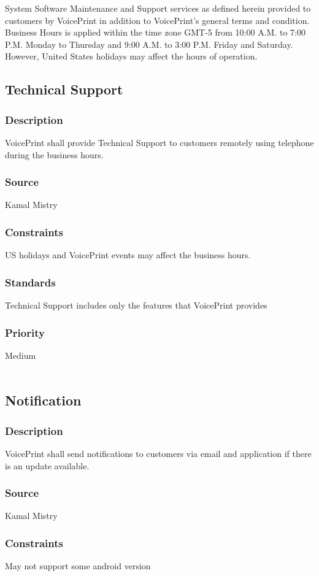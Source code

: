 System Software Maintenance and Support services as defined herein provided to customers by VoicePrint in addition to VoicePrint's general terms and condition. Business Hours is applied within the time zone GMT-5 from 10:00 A.M. to 7:00 P.M. Monday to Thursday and 9:00 A.M. to 3:00 P.M. Friday and Saturday. However, United States holidays may affect the hours of operation.

\subsection{Technical Support}
\subsubsection{Description}
VoicePrint shall provide Technical Support to customers remotely using telephone during the business hours.
\subsubsection{Source}
Kamal Mistry
\subsubsection{Constraints}
US holidays and VoicePrint events may affect the business hours.
\subsubsection{Standards}
Technical Support includes only the features that VoicePrint provides
\subsubsection{Priority}
Medium
\\
\\
\subsection{Notification}
\subsubsection{Description}
VoicePrint shall send notifications to customers via email and application if there is an update available.
\subsubsection{Source}
Kamal Mistry
\subsubsection{Constraints}
May not support some android version
